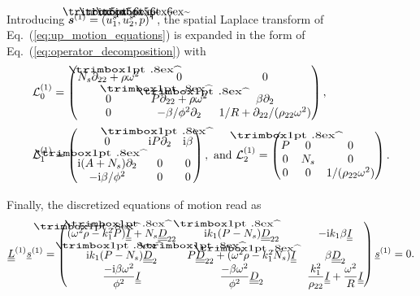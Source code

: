Introducing $ \mbf s^{(1)} =(\tilde u_1^s, \tilde u_2^s, \tilde p )^\transp$, the spatial Laplace transform of Eq.~(\ref{eq:up_motion_equations}) is expanded in the form of Eq.~(\ref{eq:operator_decomposition}) with
    \begin{equation}
        \begin{array}{l}
        \mathcal L_0^{(1)} =
            \begin{pmatrix}
                 N_s \partial_{22} + \hat \rho\omega^2 & 0 & 0 \\
                0 & \hat P \partial_{22} +\hat \rho\omega^2 & \beta \partial_2 \\
                0 & -\beta/\phi^2\partial_2 & 1/ R + \partial_{22}/( \rho_{22}\omega^2) 
            \end{pmatrix},\\[24pt]
        \mathcal L_1^{(1)} = 
            \begin{pmatrix}
                0 & \im\hat P \partial_2 & \im \beta \\
                \im(\hat A + N_s) \partial_2 & 0 & 0 \\
                -\im\beta/\phi^2 & 0 & 0 \\
            \end{pmatrix},\textrm{ and }
                 \mathcal L_2^{(1)}  = 
            \begin{pmatrix}
                \hat{P} & 0 & 0 \\
                0 &  N_s & 0 \\
                0 & 0 & 1/( \rho_{22} \omega^2)
            \end{pmatrix}.
        \end{array}
        \label{eq:up_motion_equations_decomposed}
    \end{equation}
    
Finally, the discretized equations of motion read as
    \begin{equation}   
        \nummat L^{(1)} \numvec s^{(1)} = \begin{pmatrix}
            (\omega^2 \hat {\rho} - k_1^2 \hat {P}) \nummat I +  N_s \nummat D_{22}
            & \im  k_1 (\hat{P} -  N_s) \nummat D_{22} 
                & -\im k_1 \beta \nummat I \\
                \im  k_1 (\hat{P} -  N_s) \nummat D_2 
                & \hat{P} \nummat D_{22} +(\omega^2 \hat{\rho} -  k_1^2   N_s) \nummat I
                & \beta \nummat D_2 \\

                \displaystyle \frac{-\im  \beta \omega^2}{\phi^2} \nummat I &\displaystyle \frac{-\beta \omega^2}{\phi^2} \nummat D_2 & 
                \displaystyle \frac{ k_1^2}{ \rho_{22}} \nummat I + \displaystyle \frac{\omega^2}{ R} \nummat I

            \end{pmatrix} \numvec s^{(1)} = 0. 
            \label{eq:up_motion_equations_discrete}
        \end{equation}
    
